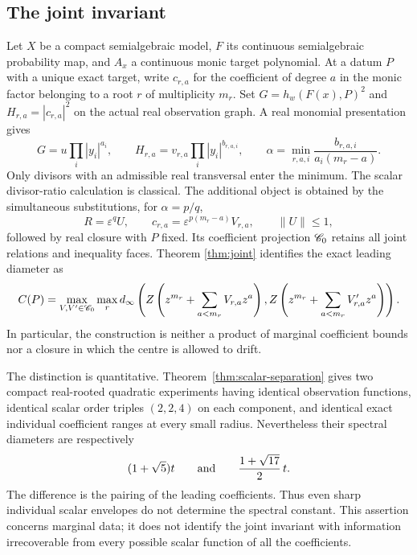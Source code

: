 \subsection*{The joint invariant}
Let $X$ be a compact semialgebraic model, $F$ its continuous semialgebraic
probability map, and $A_x$ a continuous monic target polynomial. At a datum
$P$ with a unique exact target, write $c_{r,a}$ for the coefficient of
degree $a$ in the monic factor belonging to a root $r$ of multiplicity
$m_r$. Set $G=h_w(F(x),P)^2$ and $H_{r,a}=|c_{r,a}|^2$ on the actual
real observation graph. A real monomial presentation gives
\[
 G=u\prod_i|y_i|^{a_i},\qquad
 H_{r,a}=v_{r,a}\prod_i|y_i|^{b_{r,a,i}},\qquad
 \alpha=\min_{r,a,i}\frac{b_{r,a,i}}{a_i(m_r-a)}.
\]
Only divisors with an admissible real transversal enter the minimum.
The scalar divisor-ratio calculation is classical. The additional object
is obtained by the simultaneous substitutions, for $\alpha=p/q$,
\[
 R=\varepsilon^q U,\qquad
 c_{r,a}=\varepsilon^{p(m_r-a)}V_{r,a},\qquad \|U\|\le1,
\]
followed by real closure with $P$ fixed. Its coefficient projection
$\mathscr C_0$ retains all joint relations and inequality faces. Theorem
\ref{thm:joint} identifies the exact leading diameter as
\[
 C(P)=\max_{V,V'\in\mathscr C_0}\max_r d_\infty\left(
 Z\left(z^{m_r}+\sum_{a<m_r}V_{r,a}z^a\right),
 Z\left(z^{m_r}+\sum_{a<m_r}V'_{r,a}z^a\right)\right).
\]
In particular, the construction is neither a product of marginal
coefficient bounds nor a closure in which the centre is allowed to drift.

The distinction is quantitative. Theorem~\ref{thm:scalar-separation}
gives two compact real-rooted quadratic experiments having identical
observation functions, identical scalar order triples $(2,2,4)$ on each
component, and identical exact individual coefficient ranges at every
small radius. Nevertheless their spectral diameters are respectively
\[
 (1+\sqrt5)t\qquad\hbox{and}\qquad \frac{1+\sqrt{17}}2\,t.
\]
The difference is the pairing of the leading coefficients. Thus even
sharp individual scalar envelopes do not determine the spectral constant.
This assertion concerns marginal data; it does not identify the joint
invariant with information irrecoverable from every possible scalar
function of all the coefficients.

